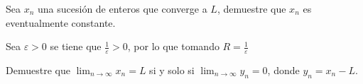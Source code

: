 \documentclass{ayudantia}
\begin{document}
\begin{ans}
    \begin{sol}

    \end{sol}
\end{ans}




\begin{prob}
    Sea \(x_n\) una sucesión de enteros que converge a \(L\), demuestre que \(x_n\) es eventualmente constante.
\end{prob}

\begin{ans}
    \begin{sol}
        Sea \(\varepsilon>0\) se tiene que \(\frac1\varepsilon>0\), por lo que tomando \(R=\frac1\varepsilon\)
    \end{sol}
\end{ans}


\begin{prob}
    Demuestre que \(\lim_{n\rightarrow\infty}x_n=L\) si y solo si \(\lim_{n\rightarrow\infty}y_n=0\), donde \(y_n=x_n-L\).
\end{prob}

\begin{ans}
    \begin{sol}

    \end{sol}
\end{ans}
\end{document}
